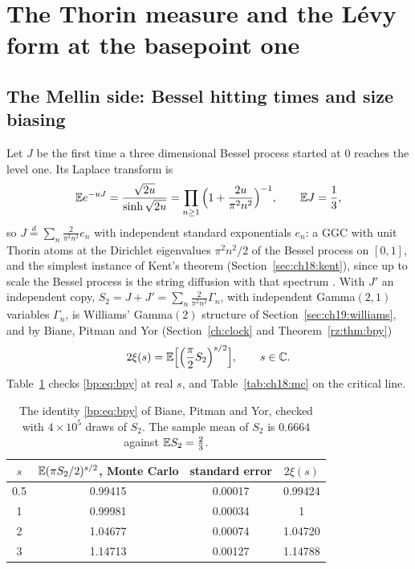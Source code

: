 \section{The Thorin measure and the L\'evy form at the basepoint one}\label{ch:basepoint}


\subsection{The Mellin side: Bessel hitting times and size biasing}\label{bp:sec:mellin}

Let $J$ be the first time a three dimensional Bessel process started at $0$ reaches the level one. Its Laplace transform is
\[
\mathbb{E} e^{-uJ}=\frac{\sqrt{2u}}{\sinh\sqrt{2u}}=\prod_{n\ge1}\Big(1+\frac{2u}{\pi^2n^2}\Big)^{-1},\qquad \mathbb{E} J=\frac13,
\]
so $J\stackrel d=\sum_n\frac2{\pi^2n^2}e_n$ with independent standard exponentials $e_n$: a GGC with unit Thorin atoms at the Dirichlet eigenvalues $\pi^2n^2/2$ of the Bessel process on $[0,1]$, and the simplest instance of Kent's theorem (Section~\ref{sec:ch18:kent}), since up to scale the Bessel process is the string diffusion with that spectrum \cite{Kent80}. With $J'$ an independent copy, $S_2=J+J'=\sum_n\frac2{\pi^2n^2}\Gamma_n$, with independent Gamma$(2,1)$ variables $\Gamma_n$, is Williams' Gamma$(2)$ structure \cite{Williams90} of Section~\ref{sec:ch19:williams}, and by Biane, Pitman and Yor \cite{BPY01} (Section~\ref{ch:clock} and Theorem~\ref{rz:thm:bpy})
\begin{equation}\label{bp:eq:bpy}
2\xi(s)=\mathbb{E}\Big[\Big(\frac\pi2S_2\Big)^{s/2}\Big],\qquad s\in\mathbb{C} .
\end{equation}
Table~\ref{bp:tab:bpy} checks \eqref{bp:eq:bpy} at real $s$, and Table~\ref{tab:ch18:mc} on the critical line.

\begin{table}[htbp]
\centering\small
\begin{tabular}{cccc}
\toprule
$s$ & $\mathbb{E}(\pi S_2/2)^{s/2}$, Monte Carlo & standard error & $2\xi(s)$\\
\midrule
0.5 & 0.99415 & 0.00017 & 0.99424\\
1 & 0.99981 & 0.00034 & 1\\
2 & 1.04677 & 0.00074 & 1.04720\\
3 & 1.14713 & 0.00127 & 1.14788\\
\bottomrule
\end{tabular}
\caption{The identity \eqref{bp:eq:bpy} of Biane, Pitman and Yor, checked with $4\times10^5$ draws of $S_2$. The sample mean of $S_2$ is $0.6664$ against $\mathbb{E} S_2=\frac23$.}
\label{bp:tab:bpy}
\end{table}

